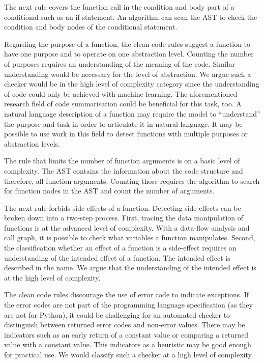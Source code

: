 The next rule covers the function call in the condition and body part of a conditional such as an if-statement. An algorithm can scan the AST to check the condition and body nodes of the conditional statement.

Regarding the purpose of a function, the clean code rules suggest a function to have one purpose and to operate on one abstraction level. Counting the number of purposes requires an understanding of the meaning of the code. Similar understanding would be necessary for the level of abstraction. We argue such a checker would be in the high level of complexity category since the understanding of code could only be achieved with machine learning. The aforementioned research field of code summarisation could be beneficial for this task, too. A natural language description of a function may require the model to \enquote{understand} the purpose and task in order to articulate it in natural language. It may be possible to use work in this field to detect functions with multiple purposes or abstraction levels.
 
The rule that limits the number of function arguments is on a basic level of complexity. The AST contains the information about the code structure and therefore, all function arguments. Counting those requires the algorithm to search for function nodes in the AST and count the number of arguments.

The next rule forbids side-effects of a function. Detecting side-effects can be broken down into a two-step process.
First, tracing the data manipulation of functions is at the advanced level of complexity. With a data-flow analysis and call graph, it is possible to check what variables a function manipulates. Second, the classification whether an effect of a function is a side-effect requires an understanding of the intended effect of a function. The intended effect is described in the name. We argue that the understanding of the intended effect is at the high level of complexity. 

The clean code rules discourage the use of error code to indicate exceptions. If the error codes are not part of the programming language specification (as they are not for Python), it could be challenging for an automated checker to distinguish between returned error codes and non-error values. There may be indicators such as an early return of a constant value or comparing a returned value with a constant value. This indicators as a heuristic may be good enough for practical use. We would classify such a checker at a high level of complexity. 

